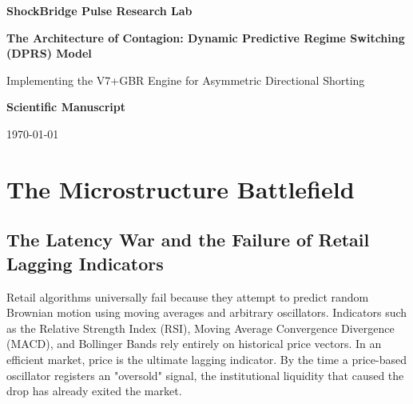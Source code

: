 \documentclass[11pt,a4paper]{report}
\begin{document}
\begin{titlepage}
    \centering
    \vspace*{3cm}
    {\Huge\bfseries ShockBridge Pulse Research Lab\par}
    \vspace{2cm}
    {\Huge\bfseries The Architecture of Contagion: Dynamic Predictive Regime Switching (DPRS) Model\par}
    \vspace{1.5cm}
    {\Large Implementing the V7+GBR Engine for Asymmetric Directional Shorting\par}
    \vspace{3cm}
    {\Large \textbf{Scientific Manuscript}\par}
    \vfill
    {\large \today\par}
\end{titlepage}

\begin{abstract}
\noindent The ShockBridge Pulse Research Lab presents a novel quantitative framework, the Dynamic Predictive Regime Switching (DPRS) Model, engineered specifically to hunt and capitalize on high-velocity contagion events in the cryptocurrency markets. By categorically rejecting retail-level lagging indicators and fictitious data, this research establishes the Bitcoin derivatives funding rate as a deterministic 45-minute oracle for macro liquidity panic. We detail the empirical validation of this contagion matrix across structurally fragile, high-beta altcoins (Avalanche and Solana). Our apex architecture, the V7+GBR Engine, successfully maps localized `$3\\sigma`$ standard deviations in derivatives funding to real-time panic probabilities, triggering asymmetric directional shorts. Over a continuous 194,666 interval (5-year) empirical simulation, the V7+GBR effectively isolated the alpha decay caused by exchange fee constraints, strictly activating upon the mathematically rigorous 11.0\% Profitability Threshold.
\end{abstract}

\tableofcontents
\newpage
\onehalfspacing

\chapter{The Microstructure Battlefield}
\section{The Latency War and the Failure of Retail Lagging Indicators}
Retail algorithms universally fail because they attempt to predict random Brownian motion using moving averages and arbitrary oscillators. Indicators such as the Relative Strength Index (RSI), Moving Average Convergence Divergence (MACD), and Bollinger Bands rely entirely on historical price vectors. In an efficient market, price is the ultimate lagging indicator. By the time a price-based oscillator registers an "oversold" signal, the institutional liquidity that caused the drop has already exited the market.
\end{document}

